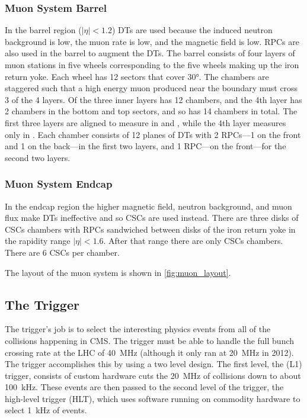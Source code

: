 \subsubsection{Muon System Barrel}

In the barrel region ($|\eta| < 1.2$) DTs are used because the induced neutron
background is low, the muon rate is low, and the magnetic field is low. RPCs
are also used in the barrel to augment the DTs. The barrel consists of four
layers of muon stations in five wheels corresponding to the five wheels making
up the iron return yoke. Each wheel has \num{12} sectors that cover \ang{30}.
The chambers are staggered such that a high energy muon produced near the
boundary must cross \num{3} of the \num{4} layers. Of the three inner layers
has \num{12} chambers, and the 4th layer has \num{2} chambers in the bottom and
top sectors, and so has \num{14} chambers in total. The first three layers are
aligned to measure in \coordrphi and \coordz, while the 4th layer measures only
in \coordrphi. Each chamber consists of \num{12} planes of DTs with \num{2}
RPCs---\num{1} on the front and \num{1} on the back---in the first two layers,
and \num{1} RPC---on the front---for the second two layers.

\subsubsection{Muon System Endcap}

In the endcap region the higher magnetic field, neutron background, and muon
flux make DTs ineffective and so CSCs are used instead. There are three disks
of CSCs chambers with RPCs sandwiched between disks of the iron return yoke in
the rapidity range $|\eta| < 1.6$. After that range there are only CSCs
chambers. There are \num{6} CSCs per chamber.

The layout of the muon system is shown in \cref{fig:muon_layout}.

\subsection{The Trigger}
\label{ssec:trigger}

The trigger's job is to select the interesting physics events from all of the
collisions happening in CMS. The trigger must be able to handle the full bunch
crossing rate at the LHC of \SI{40}{\mega\hertz} (although it only ran at
\SI{20}{\mega\hertz} in 2012). The trigger accomplishes this by using a two
level design. The first level, the \Lone (L1) trigger, consists of custom
hardware cuts the \SI{20}{\mega\hertz} of collisions down to about
\SI{100}{\kilo\hertz}. These events are then passed to the second level of the
trigger, the high-level trigger (HLT), which uses software running on commodity
hardware to select \SI{1}{\kilo\hertz} of events.

